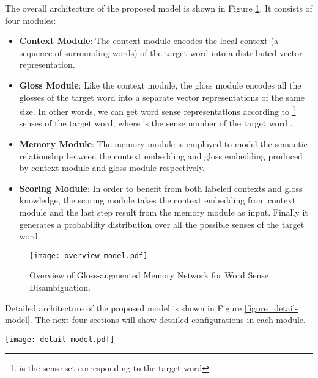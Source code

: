 \documentclass[11pt,a4paper]{article}
\begin{document}
The overall architecture of the proposed model is shown in Figure \ref{figure_overview-model}. It consists of four modules:
\begin{itemize}
  \item \textbf{Context Module}:
  The context module encodes the local context (a sequence of surrounding words) of the target word into a distributed vector representation.
  \item \textbf{Gloss Module}:
  Like the context module, the gloss module encodes all the glosses of the target word into a separate vector representations of the same size.
In other words, we can get  word sense representations according to  \footnote{ is the sense set   corresponding to the target word } senses of the target word,
  where  is the sense number of the target word  .
  \item \textbf{Memory Module}:
The memory module is employed to model the semantic relationship between the context embedding and gloss embedding produced by context module and gloss module respectively.
\item \textbf{Scoring Module}:
  In order to benefit from both labeled contexts and gloss knowledge, the scoring module takes the context embedding from context module and the last step result from the memory module as input.
  Finally it generates a probability distribution over all the possible senses of the target word.
\end{itemize}

\begin{figure}[]
\centering
\texttt{[image: overview-model.pdf]}
\vspace{-0.25in}
\caption{Overview of Gloss-augmented Memory Network for Word Sense Disambiguation.}\label{figure_overview-model}
\vspace{-0.15in}
\end{figure}



Detailed architecture of the proposed model is shown in Figure \ref{figure_detail-model}.
The next four sections will show detailed configurations in each module.

\begin{figure*}[]
\centering
\texttt{[image: detail-model.pdf]}
\vspace{-0.3in}
\caption{Detailed architecture of our proposed model, which consists of a context module, a  gloss module, a memory module and a scoring module.
The context module encodes the adjacent words surrounding the target word into a vector .
The gloss module encodes the original gloss or extended glosses into a vector .
In the memory module, we calculate the inner relationship (as attention) between context  and each gloss  and then update the memory as  at pass .
In the scoring module, we make final predictions based on the last pass attention of memory module and the context vector .
Note that GAS only uses the original gloss, while GAS uses the entended glosses through hypernymy and hyponymy relations.
In other words, the relation fusion layer (grey dotted box) only belongs to GAS.
}\label{figure_detail-model}
\end{figure*}
\end{document}
